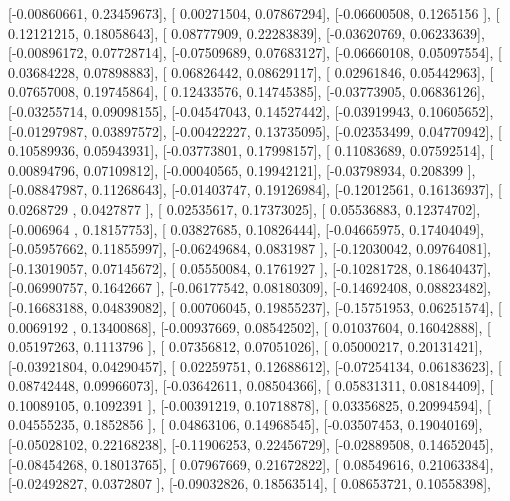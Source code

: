 \documentclass{article}
\begin{document}
       [-0.00860661,  0.23459673],
       [ 0.00271504,  0.07867294],
       [-0.06600508,  0.1265156 ],
       [ 0.12121215,  0.18058643],
       [ 0.08777909,  0.22283839],
       [-0.03620769,  0.06233639],
       [-0.00896172,  0.07728714],
       [-0.07509689,  0.07683127],
       [-0.06660108,  0.05097554],
       [ 0.03684228,  0.07898883],
       [ 0.06826442,  0.08629117],
       [ 0.02961846,  0.05442963],
       [ 0.07657008,  0.19745864],
       [ 0.12433576,  0.14745385],
       [-0.03773905,  0.06836126],
       [-0.03255714,  0.09098155],
       [-0.04547043,  0.14527442],
       [-0.03919943,  0.10605652],
       [-0.01297987,  0.03897572],
       [-0.00422227,  0.13735095],
       [-0.02353499,  0.04770942],
       [ 0.10589936,  0.05943931],
       [-0.03773801,  0.17998157],
       [ 0.11083689,  0.07592514],
       [ 0.00894796,  0.07109812],
       [-0.00040565,  0.19942121],
       [-0.03798934,  0.208399  ],
       [-0.08847987,  0.11268643],
       [-0.01403747,  0.19126984],
       [-0.12012561,  0.16136937],
       [ 0.0268729 ,  0.0427877 ],
       [ 0.02535617,  0.17373025],
       [ 0.05536883,  0.12374702],
       [-0.006964  ,  0.18157753],
       [ 0.03827685,  0.10826444],
       [-0.04665975,  0.17404049],
       [-0.05957662,  0.11855997],
       [-0.06249684,  0.0831987 ],
       [-0.12030042,  0.09764081],
       [-0.13019057,  0.07145672],
       [ 0.05550084,  0.1761927 ],
       [-0.10281728,  0.18640437],
       [-0.06990757,  0.1642667 ],
       [-0.06177542,  0.08180309],
       [-0.14692408,  0.08823482],
       [-0.16683188,  0.04839082],
       [ 0.00706045,  0.19855237],
       [-0.15751953,  0.06251574],
       [ 0.0069192 ,  0.13400868],
       [-0.00937669,  0.08542502],
       [ 0.01037604,  0.16042888],
       [ 0.05197263,  0.1113796 ],
       [ 0.07356812,  0.07051026],
       [ 0.05000217,  0.20131421],
       [-0.03921804,  0.04290457],
       [ 0.02259751,  0.12688612],
       [-0.07254134,  0.06183623],
       [ 0.08742448,  0.09966073],
       [-0.03642611,  0.08504366],
       [ 0.05831311,  0.08184409],
       [ 0.10089105,  0.1092391 ],
       [-0.00391219,  0.10718878],
       [ 0.03356825,  0.20994594],
       [ 0.04555235,  0.1852856 ],
       [ 0.04863106,  0.14968545],
       [-0.03507453,  0.19040169],
       [-0.05028102,  0.22168238],
       [-0.11906253,  0.22456729],
       [-0.02889508,  0.14652045],
       [-0.08454268,  0.18013765],
       [ 0.07967669,  0.21672822],
       [ 0.08549616,  0.21063384],
       [-0.02492827,  0.0372807 ],
       [-0.09032826,  0.18563514],
       [ 0.08653721,  0.10558398],
\end{document}
